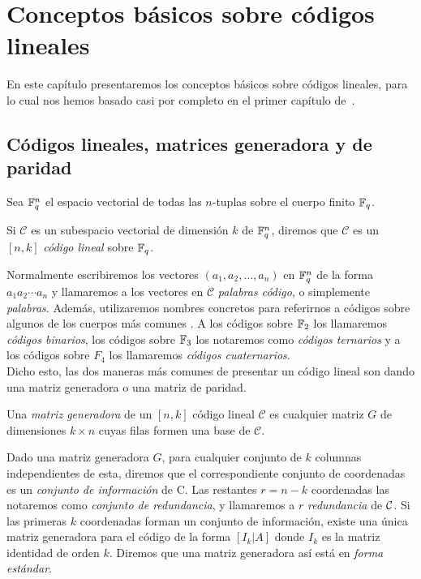 \chapter{Conceptos básicos sobre códigos lineales}%
\label{chap:conceptos_básicos_sobre_códigos_lineales}

En este capítulo presentaremos los conceptos básicos sobre códigos lineales, para lo cual nos hemos basado casi por completo en el primer capítulo de~\cite{foecc}.

\section{Códigos lineales, matrices generadora y de paridad}%
\label{sec:códigos_lineales_matrices_generadora_y_de_paridad}

Sea \(\mathbb{F}_q^n\) el espacio vectorial de todas las \(n\)-tuplas sobre el cuerpo finito \(\mathbb{F}_q\).

\begin{definition}
Si \(\mathcal{C}\) es un subespacio vectorial de dimensión \(k\) de \(\mathbb{F}_q^n\), diremos que \(\mathcal{C}\) es un \([n,k]\) \textit{código lineal} sobre \(\mathbb{F}_q\).
\end{definition}

Normalmente escribiremos los vectores \((a_1, a_2, \dots, a_n)\) en \(\mathbb{F}_q^n\) de la forma \(a_1 a_2 \cdots a_n\) y llamaremos a los vectores en \(\mathcal{C}\) \textit{palabras código}, o simplemente \textit{palabras}. Además, utilizaremos nombres concretos para referirnos a códigos sobre algunos de los cuerpos más comunes . A los códigos sobre \(\mathbb{F}_2\) los llamaremos \textit{códigos binarios}, los códigos sobre \(\mathbb{F}_3\) los notaremos como \textit{códigos ternarios} y a los códigos sobre \(F_4\) los llamaremos \textit{códigos cuaternarios}.\\

Dicho esto, las dos maneras más comunes de presentar un código lineal son dando una matriz generadora o una matriz de paridad.

\begin{definition}
    Una \textit{matriz generadora} de un \([n,k]\) código lineal \(\mathcal{C}\) es cualquier matriz \(G\) de dimensiones \(k \times n\) cuyas filas formen una base de \(\mathcal{C}\).
\end{definition}

Dado una matriz generadora \(G\), para cualquier conjunto de \(k\) columnas independientes de esta, diremos que el correspondiente conjunto de coordenadas es un \textit{conjunto de información} de C. Las restantes \(r=n-k\) coordenadas las notaremos como \textit{conjunto de redundancia}, y llamaremos a \(r\) \textit{redundancia} de \(\mathcal{C}\). Si las primeras \(k\) coordenadas forman un conjunto de información, existe una única matriz generadora para el código de la forma \([I_k | A]\) donde \(I_k\) es la matriz identidad de orden \(k\). Diremos que una matriz generadora así está en \textit{forma estándar}.

